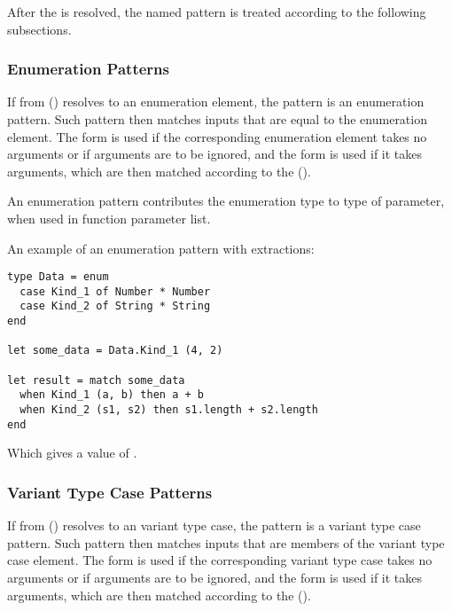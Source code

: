 After the  is resolved, the named pattern is treated according to the following subsections. 





\subsubsection{Enumeration Patterns}
\label{sec:enumeration-patterns}

If  from () resolves to an enumeration element, the pattern is an enumeration pattern. Such pattern then matches inputs that are equal to the enumeration element. The form  is used if the corresponding enumeration element takes no arguments or if arguments are to be ignored, and the form  is used if it takes arguments, which are then matched according to the  (). 

An enumeration pattern contributes the enumeration type to type of parameter, when used in function parameter list. 

\example An example of an enumeration pattern with extractions:
\begin{lstlisting}
type Data = enum
  case Kind_1 of Number * Number
  case Kind_2 of String * String
end

let some_data = Data.Kind_1 (4, 2)

let result = match some_data
  when Kind_1 (a, b) then a + b
  when Kind_2 (s1, s2) then s1.length + s2.length
end
\end{lstlisting}
Which gives  a value of . 





\subsubsection{Variant Type Case Patterns}
\label{sec:variant-patterns}

If  from () resolves to an variant type case, the pattern is a variant type case pattern. Such pattern then matches inputs that are members of the variant type case element. The form  is used if the corresponding variant type case takes no arguments or if arguments are to be ignored, and the form  is used if it takes arguments, which are then matched according to the  (). 

